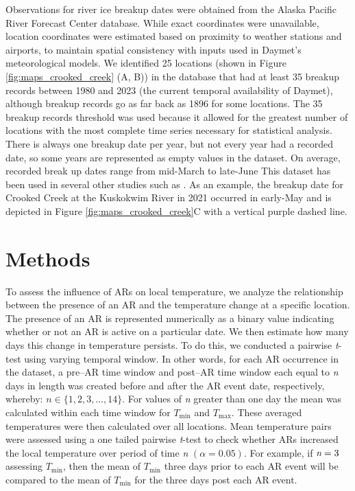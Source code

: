 \documentclass[12pts,draft]{AR_analysis_}
\begin{document}
Observations for river ice breakup dates 
were obtained from the Alaska Pacific River Forecast Center database.
While exact coordinates were unavailable, location coordinates
were estimated based on proximity to weather stations and airports, to 
maintain spatial consistency with inputs used in Daymet’s meteorological 
models. We identified 25 locations (shown in Figure 
\ref{fig:maps_crooked_creek} (A, B)) in the database that had
at least 35 breakup 
records between 1980 and 2023 (the current temporal availability of 
Daymet), although breakup records go as far back as 1896 for some 
locations. The 35 breakup records threshold was used because it 
allowed for the greatest 
number of locations with the most complete time series 
necessary for statistical analysis. There is always one breakup 
date per year, but not every year had a recorded date, so some 
years are represented as empty values in the dataset. On average, 
recorded break up dates range from mid-March to late-June 
This dataset has been used in several other studies such as 
\cite{murphy2022, Brown2018, Bieniek2011}. As an example, 
the breakup date for Crooked Creek 
at the Kuskokwim River in 2021 occurred in early-May and
is depicted in Figure 
\ref{fig:maps_crooked_creek}C with a 
vertical purple dashed line.



\section{Methods}

To assess the influence of ARs on local temperature, we analyze 
the relationship between the presence of an AR and the temperature 
change at a specific location. The presence of an AR is represented 
numerically as a binary value indicating whether or not an AR is 
active on a particular date. We then estimate how many days this 
change in temperature persists. To do this, we conducted a pairwise
\emph{t}-test using varying temporal window.
In other words, for each
AR occurrence in the dataset, a pre--AR time window and post--AR
time window each equal to \emph{n}
days in length was created before and after the AR event date, respectively,
whereby: $ n \in \{1, 2, 3, \ldots, 14\}$.
For values of \emph{n} greater than one day the mean was 
calculated within each time window
for $T_{\text{min}}$ and $T_{\text{max}}$. These averaged 
temperatures were then
calculated over all locations. Mean temperature pairs 
were assessed using a one tailed pairwise \emph{t}-test to check
whether ARs increased the local temperature over period of 
time \emph{n} $(\alpha =
0.05)$. For example, if $\emph{n} = 3$ assessing $T_{\text{min}}$,
then the mean of $T_{\text{min}}$ three days prior to each AR event
will be compared to the mean of $T_{\text{min}}$ for
the three days post each AR event.
\end{document}
